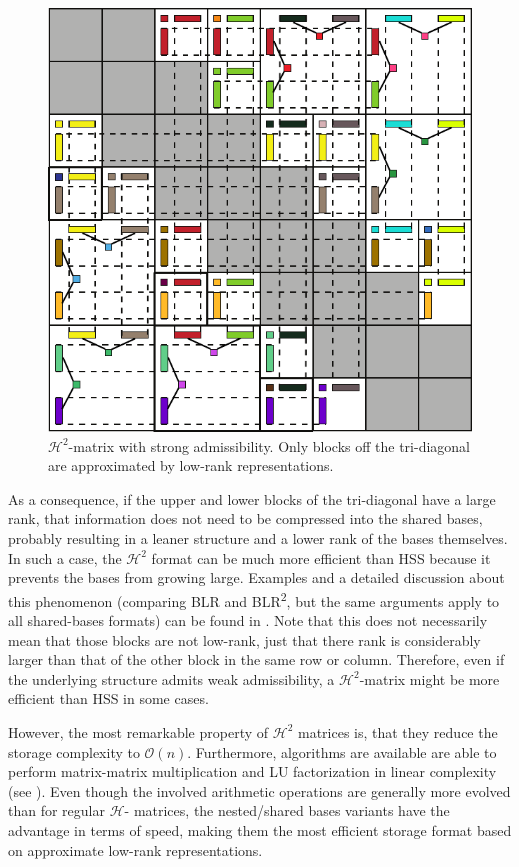 \begin{figure}[h]
    \centering
    \includegraphics[width=0.6\linewidth]{chapters/4_hierarchical_matrices/figures/H2_matrix.pdf}
    \caption[\texorpdfstring{$\mathcal{H}^2$}{H2}-matrix]{$\mathcal{H}^2$-matrix with strong admissibility. Only blocks off the tri-diagonal are approximated by low-rank representations.}
    \label{fig:h2_matrix}
\end{figure}

As a consequence, if the upper and lower blocks of the tri-diagonal have a large rank, that information does not need to be compressed into the shared bases, probably resulting in a leaner structure and a lower rank of the bases themselves. In such a case, the $\mathcal{H}^2$ format can be much more efficient than HSS because it prevents the bases from growing large. Examples and a detailed discussion about this phenomenon (comparing BLR and BLR\textsuperscript{2}, but the same arguments apply to all shared-bases formats) can be found in \cite{ashcraft_block_2020}. Note that this does not necessarily mean that those blocks are not low-rank, just that there rank is considerably larger than that of the other block in the same row or column. Therefore, even if the underlying structure admits weak admissibility, a $\mathcal{H}^2$-matrix might be more efficient than HSS in some cases.

However, the most remarkable property of $\mathcal{H}^2$ matrices is, that they reduce the storage complexity to $\mathcal{O}(n)$. Furthermore, algorithms are available are able to perform matrix-matrix multiplication and LU factorization in linear complexity (see \cite{borm_h2-matrix_2006}). Even though the involved arithmetic operations are generally more evolved than for regular $\mathcal{H}$- matrices, the nested/shared bases variants have the advantage in terms of speed, making them the most efficient storage format based on approximate low-rank representations.